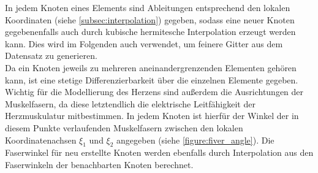 \documentclass[
	a4paper,			%
	11pt,				%
	headsepline,		%
	bibtotoc,			%
	BCOR18mm,      		%
	DIV14,				%
	headings=normal,
	numbers=noenddot,
]{scrbook}
\theoremstyle{mythmstyle}
\theoremstyle{other}
\begin{document}
		 In jedem Knoten eines Elements sind
		 Ableitungen entsprechend den lokalen Koordinaten 
		 (siehe \autoref{subsec:interpolation})
		gegeben, sodass eine neuer Knoten gegebenenfalls auch durch kubische hermitesche Interpolation
		erzeugt werden kann. Dies wird im Folgenden auch verwendet, um feinere
		Gitter aus dem Datensatz zu generieren.\\
		Da ein Knoten jeweils zu mehreren aneinandergrenzenden Elementen gehören
		kann, ist eine stetige Differenzierbarkeit über die einzelnen
		Elemente gegeben. \\
		Wichtig für die Modellierung des Herzens sind außerdem die Ausrichtungen
		der Muskelfasern, da diese letztendlich die elektrische Leitfähigkeit
		der Herzmuskulatur mitbestimmen. In jedem Knoten ist hierfür der Winkel der
		in diesem Punkte verlaufenden Muskelfasern zwischen den lokalen
		 Koordinatenachsen $\xi_1$ und $\xi_2$ angegeben (siehe \autoref{figure:fiver_angle}). 
		 Die Faserwinkel für neu erstellte Knoten
		 werden ebenfalls durch Interpolation aus den Faserwinkeln der benachbarten Knoten berechnet.
		 \clearpage
\end{document}
